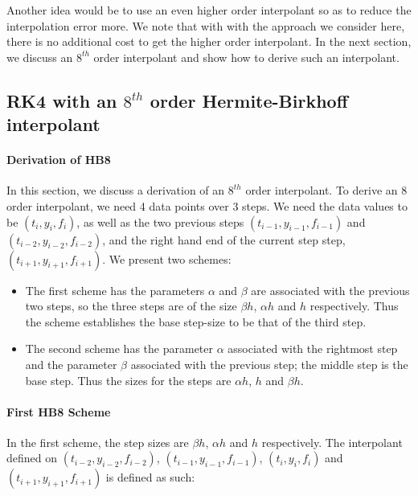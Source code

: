 Another idea would be to use an even higher order interpolant so as to reduce the interpolation error more. We note that with with the approach we consider here, there is no additional cost to get the higher order interpolant. In the next section, we discuss an $8^{th}$ order interpolant and show how to derive such an interpolant.

\subsection{RK4 with an $8^{th}$ order Hermite-Birkhoff interpolant}
\label{section:HB8_derivation}
\paragraph{Derivation of HB8}
In this section, we discuss a derivation of an $8^{th}$ order interpolant. To derive an 8 order interpolant, we need 4 data points over 3 steps. We need the data values to be $(t_i, y_i, f_i)$, as well as the two previous steps $(t_{i-1}, y_{i-1}, f_{i-1})$ and $(t_{i-2}, y_{i-2}, f_{i-2})$, and the right hand end of the current step step, $(t_{i+1}, y_{i+1}, f_{i+1})$. We present two schemes: 
\begin{itemize}
\item The first scheme has the parameters $\alpha$ and $\beta$ are associated with the previous two steps, so the three steps are of the size $\beta h$, $\alpha h$ and $h$ respectively. Thus the scheme establishes the base step-size to be that of the third step. 

\item The second scheme has the parameter $\alpha$ associated with the rightmost step and the parameter $\beta$ associated with the previous step; the middle step is the base step. Thus the sizes for the steps are $\alpha h$, $h$ and $\beta h$. 

\end{itemize}


\paragraph{First HB8 Scheme}
In the first scheme, the step sizes are $\beta h$, $\alpha h$ and $h$ respectively. The interpolant defined on $(t_{i-2}, y_{i-2}, f_{i-2})$, $(t_{i-1}, y_{i-1}, f_{i-1})$, $(t_i, y_i, f_i)$ and $(t_{i + 1}, y_{i + 1}, f_{i + 1})$ is defined as such:

